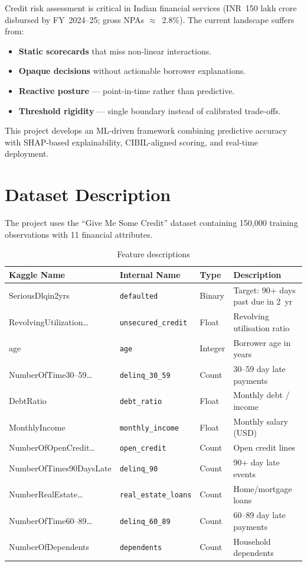 \documentclass[11pt,a4paper]{article}
\begin{document}
Credit risk assessment is critical in Indian financial services (INR~150 lakh crore disbursed by FY~2024--25; gross NPAs $\approx$~2.8\%). The current landscape suffers from:
\begin{itemize}
    \item \textbf{Static scorecards} that miss non-linear interactions.
    \item \textbf{Opaque decisions} without actionable borrower explanations.
    \item \textbf{Reactive posture} --- point-in-time rather than predictive.
    \item \textbf{Threshold rigidity} --- single boundary instead of calibrated trade-offs.
\end{itemize}
This project develops an ML-driven framework combining predictive accuracy with SHAP-based explainability, CIBIL-aligned scoring, and real-time deployment.


\section{Dataset Description}

The project uses the ``Give Me Some Credit'' dataset containing 150,000 training observations with 11 financial attributes.

\begin{table}[H]
\centering\small
\caption{Feature descriptions}
\begin{tabular}{@{}llll@{}}
\toprule
\textbf{Kaggle Name} & \textbf{Internal Name} & \textbf{Type} & \textbf{Description} \\
\midrule
SeriousDlqin2yrs & \texttt{defaulted} & Binary & Target: 90+ days past due in 2~yr \\
RevolvingUtilization\ldots & \texttt{unsecured\_credit} & Float & Revolving utilisation ratio \\
age & \texttt{age} & Integer & Borrower age in years \\
NumberOfTime30--59\ldots & \texttt{delinq\_30\_59} & Count & 30--59 day late payments \\
DebtRatio & \texttt{debt\_ratio} & Float & Monthly debt / income \\
MonthlyIncome & \texttt{monthly\_income} & Float & Monthly salary (USD) \\
NumberOfOpenCredit\ldots & \texttt{open\_credit} & Count & Open credit lines \\
NumberOfTimes90DaysLate & \texttt{delinq\_90} & Count & 90+ day late events \\
NumberRealEstate\ldots & \texttt{real\_estate\_loans} & Count & Home/mortgage loans \\
NumberOfTime60--89\ldots & \texttt{delinq\_60\_89} & Count & 60--89 day late payments \\
NumberOfDependents & \texttt{dependents} & Count & Household dependents \\
\bottomrule
\end{tabular}
\end{table}
\end{document}
